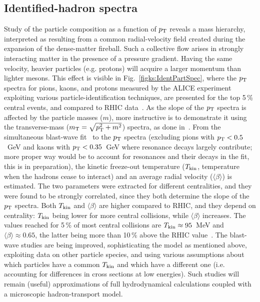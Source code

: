 \subsection{Identified-hadron spectra}
\label{subsecks:identspectra}
Study of the particle composition as a function of $p_{\rm T}$ reveals a mass hierarchy, interpreted as resulting from a common radial-velocity field created during the expansion of the dense-matter fireball. Such a collective flow arises in strongly interacting matter in the presence of a pressure gradient. Having the same velocity, heavier particles (e.g. protons) will acquire a larger momentum than lighter mesons. This effect is  visible in Fig.~\ref{figks:IdentPartSpec}, where the $p_{\rm T}$ spectra for pions, kaons, and protons measured by the ALICE experiment~\cite{Abelev:2012wca,Abelev:2013vea} exploiting various particle-identification techniques, are presented for the top 5\,\% central events, and compared to RHIC data~\cite{Adler:2003cb,Abelev:2008ab}. As the slope of the $p_{\rm T}$ spectra is affected by the particle masses ($m$), more instructive is to demonstrate it using the transverse-mass  ($m_{\rm T} = \sqrt{p_{\rm T}^2 + m^2}$) spectra, as done in~\cite{Heinz:2013th}. From the simultaneous blast-wave fit~\cite{Schnedermann:1993ws} to the $p_{\rm T}$ spectra (excluding pions with $p_{\rm T} < 0.5$~GeV and kaons with $p_{\rm T} < 0.35$~GeV where resonance decays largely contribute; more proper way would be to account for resonances and their decays in the fit, this is in preparation), the kinetic freeze-out temperature ($T_{\rm kin}$, temperature when the hadrons cease to interact) and an average radial velocity ($\langle \beta \rangle$) is estimated. The two parameters were extracted for different centralities, and they were found to be strongly correlated, since they both determine the slope of the $p_{\rm T}$ spectra. Both $T_{\rm kin}$ and $\langle \beta \rangle$ are higher compared to RHIC, and they depend on centrality: $T_{\rm kin}$ being lower for more central collisions, while $\langle \beta \rangle$ increases. The values reached for 5\,\% of most central collisions are $T_{\rm kin} \approx 95$~MeV and $\langle \beta \rangle \approx 0.65$, the latter being more than 10\,\% above the RHIC value~\cite{Adams:2005dq}. The blast-wave studies are being improved, sophisticating the model as mentioned above, exploiting data on other particle species, and using various assumptions about which particles have a common $T_{\rm kin}$ and which have a different one (i.e. accounting for differences in cross sections at low energies). Such studies will remain (useful) approximations of full hydrodynamical calculations coupled with a microscopic hadron-transport model.

